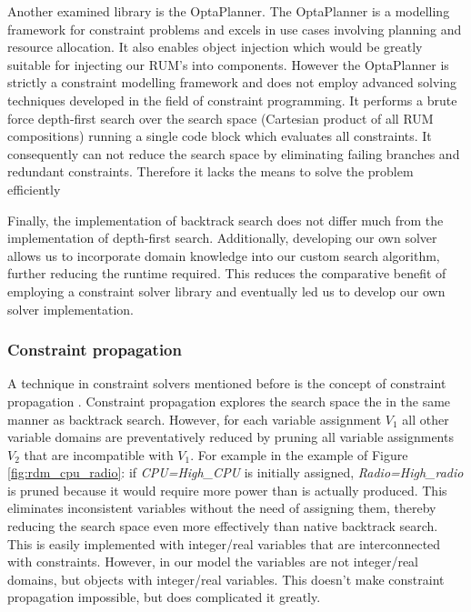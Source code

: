 Another examined library is the OptaPlanner\cite{optaplanner}. The OptaPlanner is a modelling framework for constraint problems and excels in use cases involving planning and resource allocation. It also enables object injection which would be greatly suitable for injecting our RUM's into components. However the OptaPlanner is strictly a constraint modelling framework and does not employ advanced solving techniques developed in the field of constraint programming. It performs a brute force depth-first search over the search space (Cartesian product of all RUM compositions) running a single code block which evaluates all constraints. It consequently can not reduce the search space by eliminating failing branches and redundant constraints. Therefore it lacks the means to solve the problem efficiently

Finally, the implementation of backtrack search does not differ much from the implementation of depth-first search. Additionally, developing our own solver allows us to incorporate domain knowledge into our custom search algorithm, further reducing the runtime required. This reduces the comparative benefit of employing a constraint solver library and eventually led us to develop our own solver implementation.

\subsubsection{Constraint propagation}
A technique in constraint solvers mentioned before is the concept of constraint propagation \cite{ref-zoeken}. Constraint propagation explores the search space the in the same manner as backtrack search. However, for each variable assignment $V_1$ all other variable domains are preventatively reduced by pruning all variable assignments $V_2$ that are incompatible with $V_1$. For example in the example of Figure \ref{fig:rdm_cpu_radio}: if \emph{CPU=High\_CPU} is initially assigned, \emph{Radio=High\_radio} is pruned because it would require more power than is actually produced. This eliminates inconsistent variables without the need of assigning them, thereby reducing the search space even more effectively than native backtrack search. This is easily implemented with integer/real variables that are interconnected with constraints. However, in our model the variables are not integer/real domains, but objects with integer/real variables. This doesn't make constraint propagation impossible, but does complicated it greatly.

